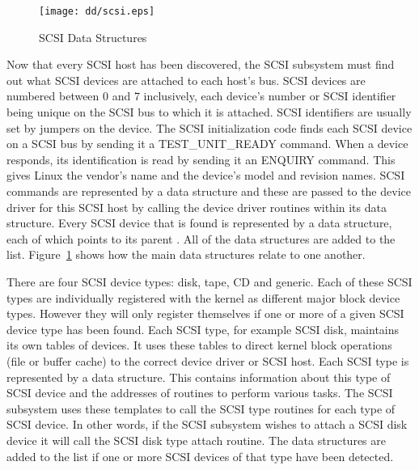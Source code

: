 \begin{figure}
\begin{center}
{\centering \texttt{[image: dd/scsi.eps]} \par}
\end{center}
\caption{SCSI Data Structures}
\label{scsi-figure}
\end{figure}
Now that every SCSI host has been discovered, the SCSI subsystem must find out what SCSI devices are
attached to each host's bus.
SCSI devices are numbered between 0 and 7 inclusively, each device's number or SCSI identifier  being
unique on the SCSI bus to which it is attached.
SCSI identifiers are usually set by jumpers on the device.
The SCSI initialization code finds each SCSI device on a SCSI bus by sending it a TEST\_UNIT\_READY command.
When a device responds, its identification is read by sending it an ENQUIRY command.
This gives Linux the vendor's name and the device's model and revision names.
SCSI commands are represented by a  data structure and these are passed to the device driver
for this SCSI host by calling the device driver routines within its  data structure.
Every SCSI device that is found is represented by a  data structure, each of which points to
its parent .
All of the  data structures are added to the  
list.
Figure~\ref{scsi-figure} shows how the main data structures relate to one another.

There are four SCSI device types: disk, tape, CD and generic.
Each of these SCSI types are individually registered with the kernel as different major block device types.
However they will only register themselves if one or more of a given SCSI device type has been found.
Each SCSI type, for example SCSI disk,  maintains its own  tables of devices.
It uses these tables to direct kernel block operations (file or buffer cache) to the correct device
driver or SCSI host.
Each SCSI type is represented by a  data structure.
This contains information about this type of SCSI device and the addresses of routines to perform various
tasks.
The SCSI subsystem uses these templates to call the SCSI type routines for each type of SCSI device.
In other words, if the SCSI subsystem wishes to attach a SCSI disk device it will call the SCSI disk type
attach routine.
The  data structures are added to the 
list if one or more SCSI devices of that type have been detected.

